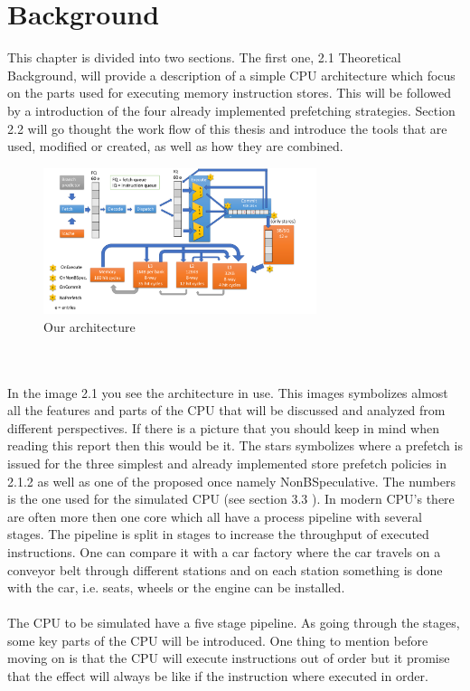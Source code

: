 \chapter{Background}
\label{chap:bg}
This chapter is divided into two sections. The first one, 2.1 \fixme Theoretical Background,
will provide a description of a simple CPU architecture which focus on the parts used
for executing memory instruction stores. This will be followed by a introduction of
the four already implemented prefetching strategies. Section 2.2 \fixme will go thought the
work flow of this thesis and introduce the tools that are used, modified or created, as
well as how they are combined.

\fixme
\begin{figure}[h]
\centering
\includegraphics[width=8cm]{figure/thoeratical-arc.PNG}
\caption{Our architecture}
\label{img:arc}
\end{figure}
\\ \\
In the image 2.1 \fixme you see the architecture in use. This images symbolizes almost all
the features and parts of the CPU that will be discussed and analyzed from different
perspectives. If there is a picture that you should keep in mind when reading this
report then this would be it. The stars symbolizes where a prefetch is issued for the
three simplest and already implemented store prefetch policies in 2.1.2 \fixme as well as one
of the proposed once namely NonBSpeculative. The numbers is the one used for the
simulated CPU (see section 3.3 \fixme). In modern CPU’s there are often more then one
core which all have a process pipeline with several stages. The pipeline is split in
stages to increase the throughput of executed instructions. One can compare it with
a car factory where the car travels on a conveyor belt through different stations and
on each station something is done with the car, i.e. seats, wheels or the engine can
be installed.
\\ \\
The CPU to be simulated have a five stage pipeline. As going through the stages,
some key parts of the CPU will be introduced. One thing to mention before moving
on is that the CPU will execute instructions out of order but it promise that the effect
will always be like if the instruction where executed in order.
 \\ \\

